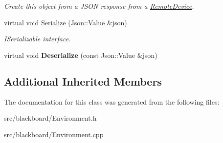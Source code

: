 \begin{DoxyCompactItemize}
\begin{DoxyCompactList}\small\item\em Create this object from a J\+S\+ON response from a \hyperlink{class_remote_device}{Remote\+Device}. \end{DoxyCompactList}\item 
\mbox{\label{class_environment_ad8e3b7d748f8bbc152ad52c4b180cd05}} 
virtual void \hyperlink{class_environment_ad8e3b7d748f8bbc152ad52c4b180cd05}{Serialize} (Json\+::\+Value \&json)
\begin{DoxyCompactList}\small\item\em I\+Serializable interface. \end{DoxyCompactList}\item 
\mbox{\label{class_environment_abcc857ccb97d4e9540436f940145552b}} 
virtual void {\bfseries Deserialize} (const Json\+::\+Value \&json)
\end{DoxyCompactItemize}
\subsection*{Additional Inherited Members}


The documentation for this class was generated from the following files\+:\begin{DoxyCompactItemize}
\item 
src/blackboard/Environment.\+h\item 
src/blackboard/Environment.\+cpp\end{DoxyCompactItemize}
